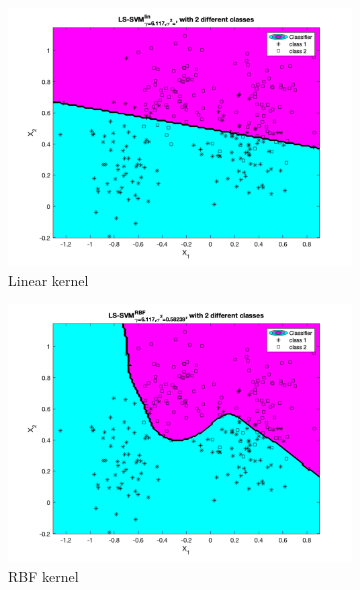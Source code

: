 \documentclass[a4paper, 11pt, one column]{article}
\begin{document}
\begin{figure}[hbt]
        \begin{subfigure}{0.45\linewidth}
            \includegraphics[width=\linewidth]{images/ripley_linear.png}
            \caption{Linear kernel}
        \end{subfigure}
        \begin{subfigure}{0.45\linewidth}
            \includegraphics[width=\linewidth]{images/ripley_rbf_1.png}
            \caption{RBF kernel}
        \end{subfigure}
        \begin{subfigure}{0.45\linewidth}

\end{subfigure}
\end{figure}
\end{document}
